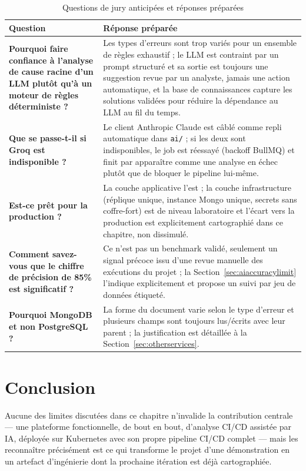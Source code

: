 \documentclass[12pt,a4paper,oneside]{report}
\begin{document}
\begin{table}[H]\centering
\caption{Questions de jury anticipées et réponses préparées}\label{tab:juryquestions}
\renewcommand{\arraystretch}{1.3}
\begin{tabularx}{\textwidth}{>{\bfseries\color{primary}}p{4.6cm} Y}
\toprule
{} Question & Réponse préparée \\
\midrule
Pourquoi faire confiance à l'analyse de cause racine d'un LLM plutôt qu'à un moteur de règles déterministe ? & Les types d'erreurs sont trop variés pour un ensemble de règles exhaustif ; le LLM est contraint par un prompt structuré et sa sortie est toujours une suggestion revue par un analyste, jamais une action automatique, et la base de connaissances capture les solutions validées pour réduire la dépendance au LLM au fil du temps. \\
Que se passe-t-il si Groq est indisponible ? & Le client Anthropic Claude est câblé comme repli automatique dans \texttt{ai/} ; si les deux sont indisponibles, le job est réessayé (backoff BullMQ) et finit par apparaître comme une analyse en échec plutôt que de bloquer le pipeline lui-même. \\
Est-ce prêt pour la production ? & La couche applicative l'est ; la couche infrastructure (réplique unique, instance Mongo unique, secrets sans coffre-fort) est de niveau laboratoire et l'écart vers la production est explicitement cartographié dans ce chapitre, non dissimulé. \\
Comment savez-vous que le chiffre de précision de 85\% est significatif ? & Ce n'est pas un benchmark validé, seulement un signal précoce issu d'une revue manuelle des exécutions du projet ; la Section~\ref{sec:aiaccuracylimit} l'indique explicitement et propose un suivi par jeu de données étiqueté. \\
Pourquoi MongoDB et non PostgreSQL ? & La forme du document varie selon le type d'erreur et plusieurs champs sont toujours lus/écrits avec leur parent ; la justification est détaillée à la Section~\ref{sec:otherservices}. \\
\bottomrule
\end{tabularx}
\end{table}

\section{Conclusion}
Aucune des limites discutées dans ce chapitre n'invalide la contribution centrale --- une plateforme fonctionnelle, de bout en bout, d'analyse CI/CD assistée par IA, déployée sur Kubernetes avec son propre pipeline CI/CD complet --- mais les reconnaître précisément est ce qui transforme le projet d'une démonstration en un artefact d'ingénierie dont la prochaine itération est déjà cartographiée.
\end{document}

